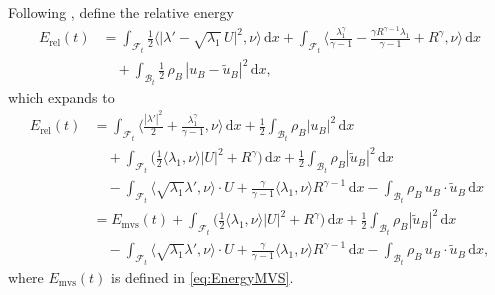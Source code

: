 \documentclass[11pt,twoside,reqno]{amsart}
\numberwithin{equation}{section}
\numberwithin{figure}{section}
\begin{document}
Following \cite{gwiazda2015weak,MR3567640}, define the relative energy
\begin{equation}\label{eq:defofRE}
\begin{aligned}
E_{\mathrm{rel}}(t)
&=\int_{\mathcal{F}_t}\frac{1}{2}\Big\langle\big|\lambda'-\sqrt{\lambda_1}\,U\big|^2,\nu\Big\rangle\,\mathrm{d}x
 +\int_{\mathcal{F}_t}\Big\langle \frac{\lambda_1^\gamma}{\gamma-1}
     -\frac{\gamma R^{\gamma-1}\lambda_1}{\gamma-1}+R^\gamma,\nu\Big\rangle\,\mathrm{d}x\\
&\quad + \int_{\mathcal{B}_t}\frac{1}{2}\,\rho_B\,|u_B-\tilde u_B|^2\,\mathrm{d}x,
\end{aligned}
\end{equation}
which expands to
\begin{equation}\label{ExpandedRelativeEnergy}
\begin{aligned}
E_{\mathrm{rel}}(t)
&=\int_{\mathcal{F}_t}\Big\langle \frac{|\lambda'|^2}{2}+\frac{\lambda_1^\gamma}{\gamma-1},\nu\Big\rangle\,\mathrm{d}x
  +\frac{1}{2}\int_{\mathcal{B}_t}\rho_B|u_B|^2\,\mathrm{d}x\\
&\quad+\int_{\mathcal{F}_t}\Big(\frac{1}{2}\langle \lambda_1,\nu\rangle |U|^2+R^\gamma\Big)\,\mathrm{d}x
     +\frac{1}{2}\int_{\mathcal{B}_t}\rho_B|\tilde u_B|^2\,\mathrm{d}x\\
&\quad-\int_{\mathcal{F}_t}\Big\langle \sqrt{\lambda_1}\lambda',\nu\Big\rangle\!\cdot U
        +\frac{\gamma}{\gamma-1}\langle \lambda_1,\nu\rangle R^{\gamma-1}\,\mathrm{d}x
      -\int_{\mathcal{B}_t}\rho_B\,u_B\cdot \tilde u_B\,\mathrm{d}x\\
&=E_{\mathrm{mvs}}(t)
  +\int_{\mathcal{F}_t}\Big(\frac{1}{2}\langle \lambda_1,\nu\rangle |U|^2+R^\gamma\Big)\,\mathrm{d}x
  +\frac{1}{2}\int_{\mathcal{B}_t}\rho_B|\tilde u_B|^2\,\mathrm{d}x\\
&\quad-\int_{\mathcal{F}_t}\Big\langle \sqrt{\lambda_1}\lambda',\nu\Big\rangle\!\cdot U
      +\frac{\gamma}{\gamma-1}\langle \lambda_1,\nu\rangle R^{\gamma-1}\,\mathrm{d}x
      -\int_{\mathcal{B}_t}\rho_B\,u_B\cdot \tilde u_B\,\mathrm{d}x,
\end{aligned}
\end{equation}
where \(E_{\mathrm{mvs}}(t)\) is defined in \eqref{eq:EnergyMVS}.
\end{document}
